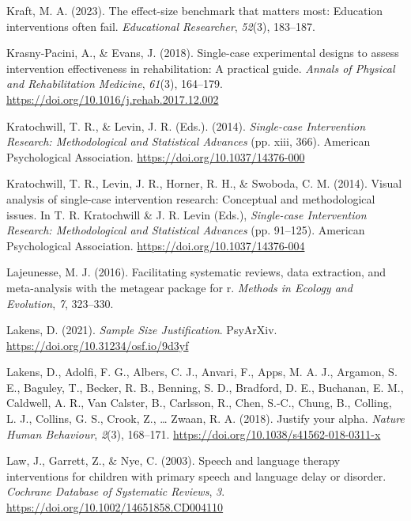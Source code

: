 \documentclass{krantz}
\newlength{\cslhangindent}
\newlength{\cslentryspacingunit} %
\newenvironment{CSLReferences}[2] %
{%
\setlength{\parindent}{0pt}
\ifodd #1
\let\oldpar\par
\def\par{\hangindent=\cslhangindent\oldpar}
\fi
\setlength{\parskip}{#2\cslentryspacingunit}
}%
{}
\begin{document}
\begin{CSLReferences}{1}{0}
\leavevmode{}%
Kraft, M. A. (2023). The effect-size benchmark that matters most: Education interventions often fail. \emph{Educational Researcher}, \emph{52}(3), 183--187.

\leavevmode{}%
Krasny-Pacini, A., \& Evans, J. (2018). Single-case experimental designs to assess intervention effectiveness in rehabilitation: {A} practical guide. \emph{Annals of Physical and Rehabilitation Medicine}, \emph{61}(3), 164--179. \url{https://doi.org/10.1016/j.rehab.2017.12.002}

\leavevmode{}%
Kratochwill, T. R., \& Levin, J. R. (Eds.). (2014). \emph{Single-case {Intervention} {Research}: {Methodological} and {Statistical} {Advances}} (pp. xiii, 366). {American Psychological Association}. \url{https://doi.org/10.1037/14376-000}

\leavevmode{}%
Kratochwill, T. R., Levin, J. R., Horner, R. H., \& Swoboda, C. M. (2014). Visual analysis of single-case intervention research: {Conceptual} and methodological issues. In T. R. Kratochwill \& J. R. Levin (Eds.), \emph{Single-case {Intervention} {Research}: {Methodological} and {Statistical} {Advances}} (pp. 91--125). {American Psychological Association}. \url{https://doi.org/10.1037/14376-004}

\leavevmode{}%
Lajeunesse, M. J. (2016). Facilitating systematic reviews, data extraction, and meta-analysis with the metagear package for r. \emph{Methods in Ecology and Evolution}, \emph{7}, 323--330.

\leavevmode{}%
Lakens, D. (2021). \emph{Sample {Size Justification}}. {PsyArXiv}. \url{https://doi.org/10.31234/osf.io/9d3yf}

\leavevmode{}%
Lakens, D., Adolfi, F. G., Albers, C. J., Anvari, F., Apps, M. A. J., Argamon, S. E., Baguley, T., Becker, R. B., Benning, S. D., Bradford, D. E., Buchanan, E. M., Caldwell, A. R., Van Calster, B., Carlsson, R., Chen, S.-C., Chung, B., Colling, L. J., Collins, G. S., Crook, Z., \ldots{} Zwaan, R. A. (2018). Justify your alpha. \emph{Nature Human Behaviour}, \emph{2}(3), 168--171. \url{https://doi.org/10.1038/s41562-018-0311-x}

\leavevmode{}%
Law, J., Garrett, Z., \& Nye, C. (2003). Speech and language therapy interventions for children with primary speech and language delay or disorder. \emph{Cochrane Database of Systematic Reviews}, \emph{3}. \url{https://doi.org/10.1002/14651858.CD004110}


\end{CSLReferences}
\end{document}
